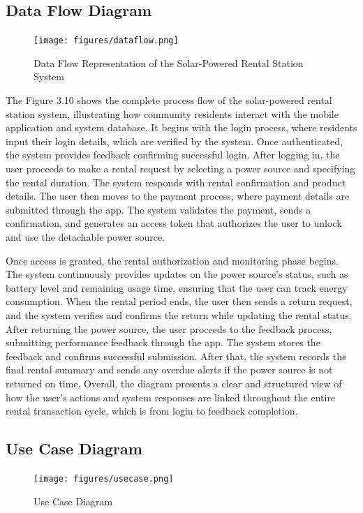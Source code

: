 {\subsection{Data Flow Diagram}
\begin{figure}[H]
	\centering
	\caption{Data Flow Representation of the Solar-Powered Rental Station System}
	\label{fig:data flow}
	\texttt{[image: figures/dataflow.png]}
\end{figure}
	
The Figure 3.10 shows the complete process flow of the solar-powered rental station system, illustrating how community residents interact with the mobile application and system database. It begins with the login process, where residents input their login details, which are verified by the system. Once authenticated, the system provides feedback confirming successful login. After logging in, the user proceeds to make a rental request by selecting a power source and specifying the rental duration. The system responds with rental confirmation and product details. The user then moves to the payment process, where payment details are submitted through the app. The system validates the payment, sends a confirmation, and generates an access token that authorizes the user to unlock and use the detachable power source.

Once access is granted, the rental authorization and monitoring phase begins. The system continuously provides updates on the power source’s status, such as battery level and remaining usage time, ensuring that the user can track energy consumption. When the rental period ends, the user then sends a return request, and the system verifies and confirms the return while updating the rental status. After returning the power source, the user proceeds to the feedback process, submitting performance feedback through the app. The system stores the feedback and confirms successful submission. After that, the system records the final rental summary and sends any overdue alerts if the power source is not returned on time. Overall, the diagram presents a clear and structured view of how the user’s actions and system responses are linked throughout the entire rental transaction cycle, which is from login to feedback completion.

\subsection{Use Case Diagram}
 \begin{figure}[H]
 	\centering
 	\caption{Use Case Diagram}
 	\label{fig:use case}
 	\texttt{[image: figures/usecase.png]}
 \end{figure}
 
}
